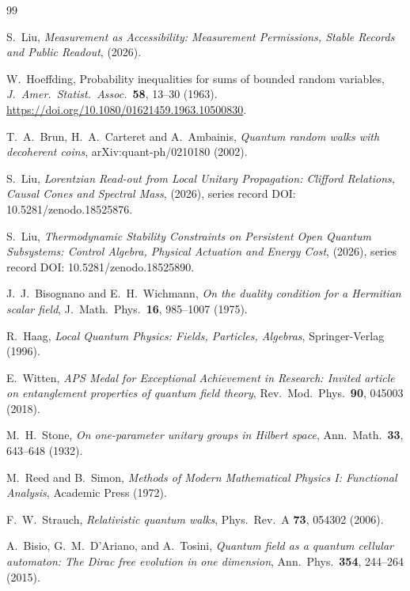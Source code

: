\documentclass[12pt,a4paper]{article}
\theoremstyle{definition}
\theoremstyle{remark}
\begin{document}
\begin{thebibliography}{99}
\raggedright

S.~Liu, \emph{Measurement as Accessibility: Measurement Permissions, Stable Records and Public Readout}, (2026).

W.~Hoeffding, Probability inequalities for sums of bounded random variables,
\emph{J.~Amer.~Statist.~Assoc.}~\textbf{58}, 13--30 (1963).
\url{https://doi.org/10.1080/01621459.1963.10500830}.

T.~A.~Brun, H.~A.~Carteret and A.~Ambainis,
\emph{Quantum random walks with decoherent coins}, arXiv:quant-ph/0210180 (2002).

S.~Liu, \emph{Lorentzian Read-out from Local Unitary Propagation: Clifford Relations, Causal Cones and Spectral Mass}, (2026), series record DOI: 10.5281/zenodo.18525876.

S.~Liu, \emph{Thermodynamic Stability Constraints on Persistent Open Quantum Subsystems: Control Algebra, Physical Actuation and Energy Cost}, (2026), series record DOI: 10.5281/zenodo.18525890.

J.~J.~Bisognano and E.~H.~Wichmann, \emph{On the duality condition for a Hermitian scalar field}, J.\ Math.\ Phys.\ \textbf{16}, 985--1007 (1975).

R.~Haag, \emph{Local Quantum Physics: Fields, Particles, Algebras}, Springer-Verlag (1996).

E.~Witten, \emph{APS Medal for Exceptional Achievement in Research: Invited article on entanglement properties of quantum field theory}, Rev.\ Mod.\ Phys.\ \textbf{90}, 045003 (2018).

M.~H.~Stone, \emph{On one-parameter unitary groups in Hilbert space}, Ann.\ Math.\ \textbf{33}, 643--648 (1932).

M.~Reed and B.~Simon, \emph{Methods of Modern Mathematical Physics I: Functional Analysis}, Academic Press (1972).

F.~W.~Strauch, \emph{Relativistic quantum walks}, Phys.\ Rev.\ A \textbf{73}, 054302 (2006).

A.~Bisio, G.~M.~D'Ariano, and A.~Tosini, \emph{Quantum field as a quantum cellular automaton: The Dirac free evolution in one dimension}, Ann.\ Phys.\ \textbf{354}, 244--264 (2015).


\end{thebibliography}
\end{document}
